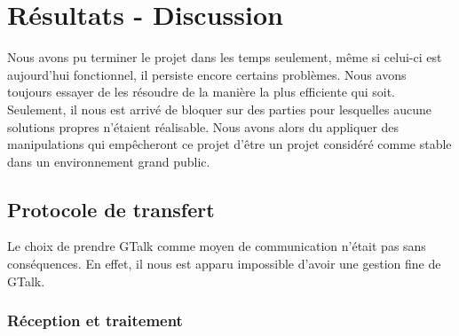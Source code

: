 \cleardoublepage



\chapter{Résultats - Discussion}

Nous avons pu terminer le projet dans les temps seulement, même si celui-ci est aujourd'hui fonctionnel, il persiste encore certains problèmes. Nous avons toujours essayer de les
résoudre de la manière la plus efficiente qui soit. Seulement, il nous est arrivé de bloquer sur des
parties pour lesquelles aucune solutions propres n'étaient réalisable. Nous avons alors du appliquer 
des manipulations qui empêcheront ce projet d'être un projet considéré comme stable dans un environnement
grand public.
\\






\section{Protocole de transfert}

Le choix de prendre GTalk comme moyen de communication n'était pas sans conséquences.
En effet, il nous est apparu impossible d'avoir une gestion fine de GTalk.
\\




\subsection{Réception et traitement}

